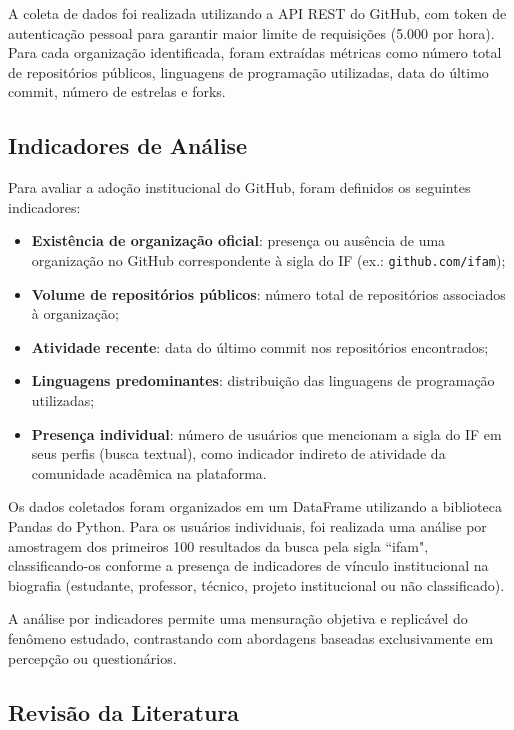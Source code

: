 \documentclass[english, spanish, brazilian]{RBIEarticle}
\begin{document}
A coleta de dados foi realizada utilizando a API REST do GitHub, com token de autenticação pessoal para garantir maior limite de requisições (5.000 por hora). Para cada organização identificada, foram extraídas métricas como número total de repositórios públicos, linguagens de programação utilizadas, data do último commit, número de estrelas e forks.

\subsection{Indicadores de Análise}

Para avaliar a adoção institucional do GitHub, foram definidos os seguintes indicadores:

\begin{itemize}
    \item \textbf{Existência de organização oficial}: presença ou ausência de uma organização no GitHub correspondente à sigla do IF (ex.: \texttt{github.com/ifam});
    \item \textbf{Volume de repositórios públicos}: número total de repositórios associados à organização;
    \item \textbf{Atividade recente}: data do último commit nos repositórios encontrados;
    \item \textbf{Linguagens predominantes}: distribuição das linguagens de programação utilizadas;
    \item \textbf{Presença individual}: número de usuários que mencionam a sigla do IF em seus perfis (busca textual), como indicador indireto de atividade da comunidade acadêmica na plataforma.
\end{itemize}

Os dados coletados foram organizados em um DataFrame utilizando a biblioteca Pandas do Python. Para os usuários individuais, foi realizada uma análise por amostragem dos primeiros 100 resultados da busca pela sigla ``ifam", classificando-os conforme a presença de indicadores de vínculo institucional na biografia (estudante, professor, técnico, projeto institucional ou não classificado).

A análise por indicadores permite uma mensuração objetiva e replicável do fenômeno estudado, contrastando com abordagens baseadas exclusivamente em percepção ou questionários.

\subsection{Revisão da Literatura}
\end{document}
